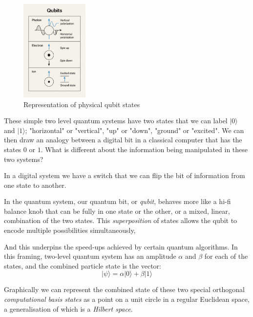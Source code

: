\begin{figure}[ht]
	\begin{adjustbox}{center}
		\includegraphics[width=0.3\textwidth, inner]{figures/physical_qubits_2.png}
	\end{adjustbox}
	\caption{Representation of physical qubit states} %
\label{fig:phys_qubit}
\end{figure}

These simple two level quantum systems have two states that we can label $\lvert0\rangle$ and $\lvert1\rangle$;
"horizontal" or "vertical", "up" or "down", "ground" or "excited".
We can then draw an analogy between a digital bit in a classical computer that has the states $0$ or $1$.
What is different about the information being manipulated in these two systems?

In a digital system we have a switch that we can flip the bit of information from one state to another.

In the quantum system, our quantum bit, or \emph{qubit}, behaves more like a hi-fi balance knob 
that can be fully in one state or the other, or a mixed, linear, combination of the two states.
This \emph{superposition} of states allows the qubit to encode multiple possibilities simultaneously, 

And this underpins the speed‑ups achieved by certain quantum algorithms\cite{Nielsen:2010}.
In this framing, two-level quantum system has an amplitude  $\alpha$ and $\beta$  for each of the states,
and the combined particle state is the vector: 
$$\lvert\psi\rangle = \alpha \lvert0\rangle + \beta \lvert1\rangle $$

Graphically we can represent the combined state of these two special orthogonal \emph{computational basis states} 
as a point on a unit circle in a regular Euclidean space, a generalisation of which is a \emph{Hilbert space}.  

